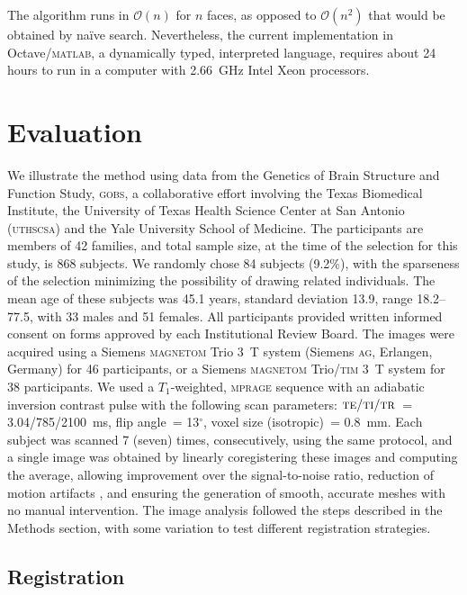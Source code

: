 The algorithm runs in $\mathcal{O}(n)$ for $n$ faces, as opposed to $\mathcal{O}(n^2)$ that would be obtained by na\"ive search. Nevertheless, the current implementation in Octave/\textsc{matlab}, a dynamically typed, interpreted language, requires about 24 hours to run in a computer with 2.66~GHz Intel Xeon processors.


\section{Evaluation}

We illustrate the method using data from the Genetics of Brain Structure and Function Study, \textsc{gobs}, a collaborative effort involving the Texas Biomedical Institute, the University of Texas Health Science Center at San Antonio (\textsc{uthscsa}) and the Yale University School of Medicine. The participants are members of 42 families, and total sample size, at the time of the selection for this study, is 868 subjects. We randomly chose 84 subjects (9.2\%), with the sparseness of the selection minimizing the possibility of drawing related individuals. The mean age of these subjects was 45.1 years, standard deviation 13.9, range 18.2--77.5, with 33 males and 51 females. All participants provided written informed consent on forms approved by each Institutional Review Board. The images were acquired using a Siemens \textsc{magnetom} Trio 3~T system (Siemens \textsc{ag}, Erlangen, Germany) for 46 participants, or a Siemens \textsc{magnetom} Trio/\textsc{tim} 3~T system for 38 participants. We used a $T_1$-weighted, \textsc{mprage} sequence with an adiabatic inversion contrast pulse with the following scan parameters: $\textsc{te}/\textsc{ti}/\textsc{tr}$~= 3.04/785/2100~ms, flip angle~= 13$^{\circ}$, voxel size (isotropic)~= 0.8~mm. Each subject was scanned 7 (seven) times, consecutively, using the same protocol, and a single image was obtained by linearly coregistering these images and computing the average, allowing improvement over the signal-to-noise ratio, reduction of motion artifacts \citep{Kochunov2006}, and ensuring the generation of smooth, accurate meshes with no manual intervention. The image analysis followed the steps described in the Methods section, with some variation to test different registration strategies.

\subsection{Registration}

